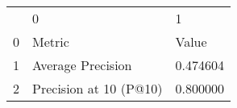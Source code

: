 \begin{tabular}{lll}
 & 0 & 1 \\
0 & Metric & Value \\
1 & Average Precision & 0.474604 \\
2 & Precision at 10 (P@10) & 0.800000 \\
\end{tabular}
